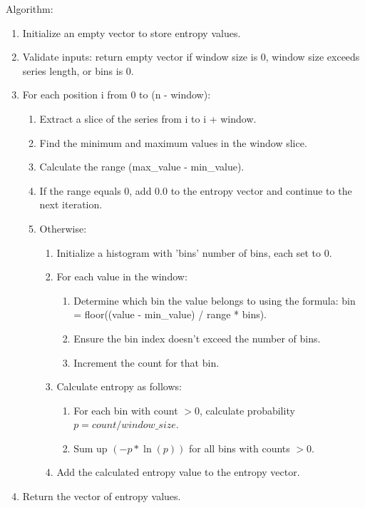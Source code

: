 Algorithm:
\begin{enumerate}
    \item Initialize an empty vector to store entropy values.
    \item Validate inputs: return empty vector if window size is 0, window size exceeds series length, or bins is 0.
    \item For each position i from 0 to (n - window):
        \begin{enumerate}
            \item Extract a slice of the series from i to i + window.
            \item Find the minimum and maximum values in the window slice.
            \item Calculate the range (max\_value - min\_value).
            \item If the range equals 0, add 0.0 to the entropy vector and continue to the next iteration.
            \item Otherwise:
                \begin{enumerate}
                    \item Initialize a histogram with 'bins' number of bins, each set to 0.
                    \item For each value in the window:
                        \begin{enumerate}
                            \item Determine which bin the value belongs to using the formula: bin = floor((value - min\_value) / range * bins).
                            \item Ensure the bin index doesn't exceed the number of bins.
                            \item Increment the count for that bin.
                        \end{enumerate}
                    \item Calculate entropy as follows:
                        \begin{enumerate}
                            \item For each bin with count $> 0$, calculate probability $p = count / window\_size$.
                            \item Sum up $(-p * \ln(p))$ for all bins with counts $> 0$.
                        \end{enumerate}
                    \item Add the calculated entropy value to the entropy vector.
                \end{enumerate}
        \end{enumerate}
    \item Return the vector of entropy values.
\end{enumerate}

